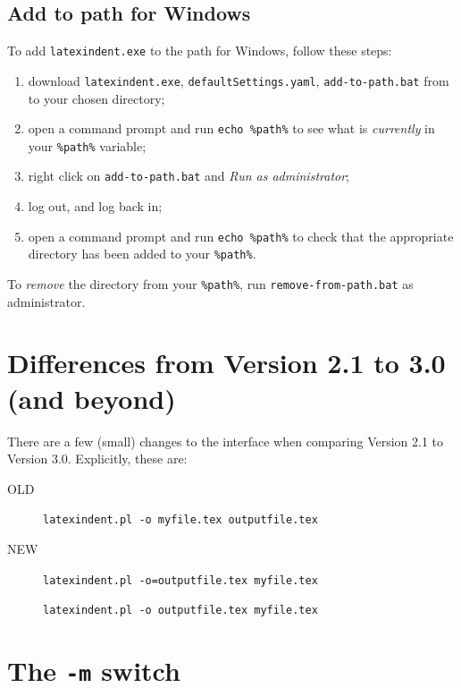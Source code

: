 \documentclass[11pt]{article}
\begin{document}
\subsection{Add to path for Windows}
To add \lstinline!latexindent.exe! to the path for Windows, follow these steps:
\begin{enumerate}
	\item download  \lstinline!latexindent.exe!, \lstinline!defaultSettings.yaml!,  \lstinline!add-to-path.bat!
	      from \cite{latexindent-home} to your chosen directory;
	\item open a command prompt and run \lstinline!echo %path%! to see what is \emph{currently} in your \lstinline!%path%! variable;
	\item right click on \lstinline!add-to-path.bat! and \emph{Run as administrator};
	\item log out, and log back in;
	\item open a command prompt and run \lstinline!echo %path%! to check that the appropriate directory has been added to your
	      \lstinline!%path%!.
\end{enumerate}
To \emph{remove} the directory from your \lstinline!%path%!, run \lstinline!remove-from-path.bat! as administrator.

\section{Differences from Version 2.1 to 3.0 (and beyond)}
There are a few (small) changes to the interface when comparing Version 2.1 to Version 3.0. 
Explicitly, these are:
\begin{description}
  \item[OLD] \lstinline!latexindent.pl -o myfile.tex outputfile.tex!
    \item[NEW] \lstinline!latexindent.pl -o=outputfile.tex myfile.tex!

      \lstinline!latexindent.pl -o outputfile.tex myfile.tex!
\end{description}

\section{The \lstinline!-m! switch}
\end{document}

